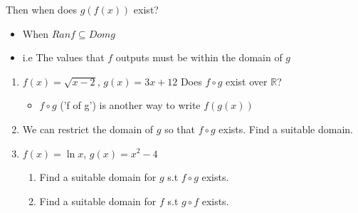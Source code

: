 \documentclass[12pt]{article}
\begin{document}
Then when does $g(f(x))$ exist?
\begin{itemize}
    \item When $Ran f \subseteq Dom g$
    \item i.e The values that $f$ outputs must be within the domain of $g$
\end{itemize}

\begin{enumerate}
    \item $f(x) = \sqrt{x - 2}$, $g(x) = 3x + 12$ Does $f \circ g$ exist over $\mathbb{R}$?
    \begin{itemize}
        \item $f \circ g$ ('f of g') is another way to write $f(g(x))$
    \end{itemize}
    \vspace{4cm}


    \item We can restrict the domain of $g$ so that $f \circ g$ exists. Find a suitable domain.
    \vspace{4cm}
    
    \item $f(x) = \ln{x}$, $g(x) = x^{2} - 4$ 
    \begin{enumerate}
        \item Find a suitable domain for $g$ s.t $f \circ g$ exists.
        \item Find a suitable domain for $f$ s.t $g \circ f$ exists.
    \end{enumerate}

\end{enumerate}
\newpage
\end{document}
